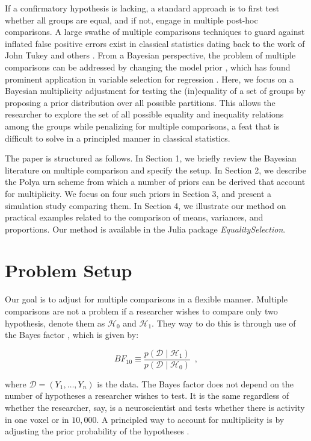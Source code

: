 \documentclass[11pt,a4paper]{article}
\theoremstyle{definition} %
\theoremstyle{case}
\begin{document}
If a confirmatory hypothesis is lacking, a standard approach is to first test whether all groups are equal, and if not, engage in multiple post-hoc comparisons. A large swathe of multiple comparisons techniques to guard against inflated false positive errors exist in classical statistics dating back to the work of John Tukey and others \parencite[][]{rao2009multiple, benjamini2002john}. From a Bayesian perspective, the problem of multiple comparisons can be addressed by changing the model prior \parencite{jeffreys1961theory, westfall1997bayesian, berry1999bayesian}, which has found prominent application in variable selection for regression \parencite[e.g.,][]{scott2006exploration, scott2010bayes}. Here, we focus on a Bayesian multiplicity adjustment for testing the (in)equality of a set of groups by proposing a prior distribution over all possible partitions. This allows the researcher to explore the set of all possible equality and inequality relations among the groups while penalizing for multiple comparisons, a feat that is difficult to solve in a principled manner in classical statistics.

The paper is structured as follows. In Section 1, we briefly review the Bayesian literature on multiple comparison and specify the setup. In Section 2, we describe the Polya urn scheme from which a number of priors can be derived that account for multiplicity. We focus on four such priors in Section 3, and present a simulation study comparing them. In Section 4, we illustrate our method on practical examples related to the comparison of means, variances, and proportions. Our method is available in the Julia package \textit{EqualitySelection}.


\section{Problem Setup}
Our goal is to adjust for multiple comparisons in a flexible manner. Multiple comparisons are not a problem if a researcher wishes to compare only two hypothesis, denote them as $\mathcal{H}_0$ and $\mathcal{H}_1$. They way to do this is through use of the Bayes factor \parencite[e.g.,][]{kass1995bayes, ly2016harold}, which is given by:

\begin{equation}
    BF_{10} \equiv \frac{p(\mathcal{D} \mid \mathcal{H}_1)}{p(\mathcal{D} \mid \mathcal{H}_0)} \enspace ,
\end{equation}

where $\mathcal{D} = (Y_1, \ldots, Y_n)$ is the data. The Bayes factor does not depend on the number of hypotheses a researcher wishes to test. It is the same regardless of whether the researcher, say, is a neuroscientist and tests whether there is activity in one voxel or in $10,000$. A principled way to account for multiplicity is by adjusting the prior probability of the hypotheses \parencite[e.g.,][]{jeffreys1961theory, westfall1997bayesian}.
\end{document}
